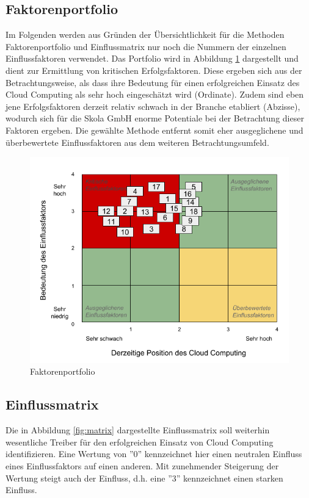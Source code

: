 \subsection{Faktorenportfolio}

Im Folgenden werden aus Gründen der Übersichtlichkeit für die Methoden Faktorenportfolio und Einflussmatrix nur noch die Nummern der einzelnen Einflussfaktoren verwendet. Das Portfolio wird in Abbildung \ref{fig:portfolio} dargestellt und dient zur Ermittlung von kritischen Erfolgsfaktoren. Diese ergeben sich aus der Betrachtungsweise, als dass ihre Bedeutung für einen erfolgreichen Einsatz des Cloud Computing als sehr hoch eingeschätzt wird (Ordinate). Zudem sind eben jene Erfolgsfaktoren derzeit relativ schwach in der Branche etabliert (Abzisse), wodurch sich für die Skola GmbH enorme Potentiale bei der Betrachtung dieser Faktoren ergeben. Die gewählte Methode entfernt somit eher ausgeglichene und überbewertete Einflussfaktoren aus dem weiteren Betrachtungsumfeld.

\begin{figure}
	\centering
	\includegraphics[width=\linewidth]{images/portfolio}
	\caption[Caption for parameters]{Faktorenportfolio}
	\label{fig:portfolio}
\end{figure}

\subsection{Einflussmatrix}

Die in Abbildung \ref{fig:matrix} dargestellte Einflussmatrix soll weiterhin wesentliche Treiber für den erfolgreichen Einsatz von Cloud Computing identifizieren. Eine Wertung von ''0'' kennzeichnet hier einen neutralen Einfluss eines Einflussfaktors auf einen anderen. Mit zunehmender Steigerung der Wertung steigt auch der Einfluss, d.h. eine ''3'' kennzeichnet einen starken Einfluss. 

